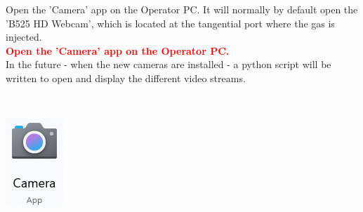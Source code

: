 \documentclass[fleqn,a4paper,20pt]{article}
\begin{document}
\begin{minipage}{.78\textwidth}
	Open the 'Camera' app on the Operator PC. It will normally by default open the 'B525 HD Webcam', which is located at the tangential port where the gas is injected.\\
	
	\textcolor{red}{\textbf{Open the 'Camera' app on the Operator PC.}}\\
	
In the future - when the new cameras are installed - a python script will be written to open and display the different video streams.
	
\end{minipage}
\begin{minipage}{.02\textwidth}
	$\ $\\
\end{minipage}
\begin{minipage}{.15\textwidth}
	\centering
	\includegraphics[width=0.85\linewidth]{Cam1}
\end{minipage}
\end{document}
